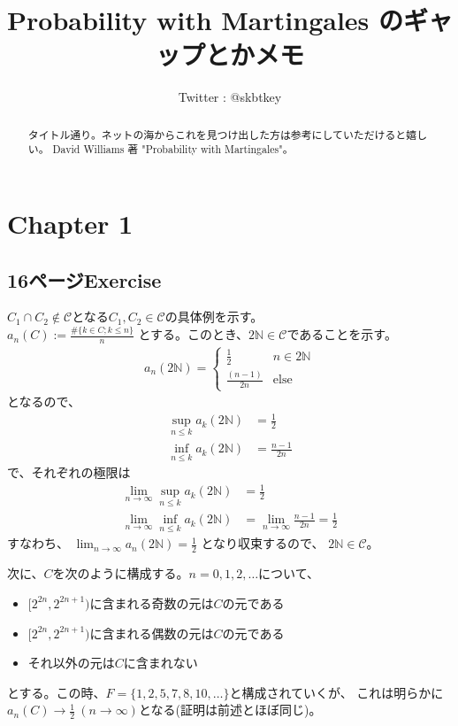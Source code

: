 \documentclass[11pt, a4paper]{jsarticle}
\title{Probability with Martingales のギャップとかメモ}
\author{Twitter : @skbtkey}
\date{}
\theoremstyle{definition}
\newcommand{\NN}{{\mathbb{N}}} %
\begin{document}
  \maketitle
  \begin{abstract}
    タイトル通り。ネットの海からこれを見つけ出した方は参考にしていただけると嬉しい。
    David Williams 著 "Probability with Martingales"。
  \end{abstract}

  \section{Chapter 1}
    \subsection{16ページExercise}
      $C_1\cap C_2\not\in\mathcal{C}$となる$C_1, C_2\in\mathcal{C}$の具体例を示す。\\
      $a_n(C) := \frac{\#\{k\in C; k\leq n\}}{n}$
      とする。このとき、$2\NN\in\mathcal{C}$であることを示す。
      \begin{align*}
        a_n(2\NN) = \left \{
        \begin{array}{cc}
          \frac{1}{2} & n\in 2\NN\\
          \frac{(n-1)}{2 n} & \mathrm{else}
        \end{array}
        \right.
      \end{align*}
      となるので、
      \begin{align*}
        \sup_{n\leq k} a_k(2\NN) &= \frac{1}{2}\\
        \inf_{n\leq k} a_k(2\NN) &= \frac{n-1}{2n}
      \end{align*}
      で、それぞれの極限は
      \begin{align*}
        \lim_{n\to\infty}\sup_{n\leq k} a_k(2\NN) &= \frac{1}{2}\\
        \lim_{n\to\infty}\inf_{n\leq k} a_k(2\NN) &= \lim_{n\to\infty}\frac{n-1}{2n} = \frac{1}{2}
      \end{align*}
      すなわち、
      $\lim_{n\to\infty} a_n(2\NN) = \frac{1}{2}$
      となり収束するので、
      $2\NN\in\mathcal{C}$。

      次に、$C$を次のように構成する。$n = 0,1,2,\ldots$について、
      \begin{itemize}
        \item $[2^{2n}, 2^{2n + 1})$に含まれる奇数の元は$C$の元である
        \item $[2^{2n}, 2^{2n + 1})$に含まれる偶数の元は$C$の元である
        \item それ以外の元は$C$に含まれない
      \end{itemize}
      とする。この時、$F = \{1,2,5,7,8,10,\ldots\}$と構成されていくが、
      これは明らかに$a_n(C)\to\frac{1}{2}\ (n\to\infty)$となる(証明は前述とほぼ同じ)。
      
\end{document}

